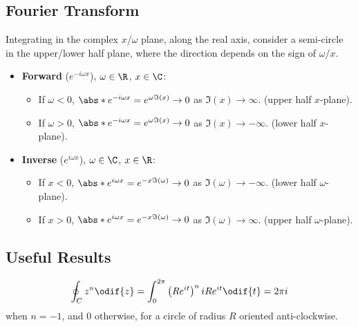\documentclass{article}
\begin{document}
\begin{multicols*}{3}
    \subsection{Fourier Transform}
    Integrating in the complex \(x\)/\(\omega\) plane, along the real axis, consider a semi-circle in the upper/lower half plane,
    where the direction depends on the sign of \(\omega\)/\(x\).
    \begin{itemize}
        \item \textbf{Forward} (\(e^{-i\omega x}\)), \(\omega \in \R\), \(x \in \C\):
        \begin{itemize}
            \item If \(\omega < 0\), \(\abs*{e^{-i \omega x}} = e^{\omega \Im{\left( x \right)}} \to 0\) as \(\Im{\left( x \right)} \to \infty\).
            (upper half \(x\)-plane).
            \item If \(\omega > 0\), \(\abs*{e^{-i \omega x}} = e^{\omega \Im{\left( x \right)}} \to 0\) as \(\Im{\left( x \right)} \to -\infty\).
            (lower half \(x\)-plane).
        \end{itemize}
        \item \textbf{Inverse} (\(e^{i\omega x}\)), \(\omega \in \C\), \(x \in \R\):
        \begin{itemize}
            \item If \(x < 0\), \(\abs*{e^{i \omega x}} = e^{-x \Im{\left( \omega \right)}} \to 0\) as \(\Im{\left( \omega \right)} \to -\infty\).
            (lower half \(\omega\)-plane).
            \item If \(x > 0\), \(\abs*{e^{i \omega x}} = e^{-x \Im{\left( \omega \right)}} \to 0\) as \(\Im{\left( \omega \right)} \to \infty\).
            (upper half \(\omega\)-plane).
        \end{itemize}
    \end{itemize}
    \subsection{Useful Results}
    \begin{equation*}
        \oint_C z^n \odif{z} = \int_0^{2\pi} \left( Re^{it} \right)^n iRe^{it} \odif{t} = 2\pi i
    \end{equation*}
    when \(n = -1\), and \(0\) otherwise, for a circle of radius \(R\) oriented anti-clockwise.

\end{multicols*}
\end{document}
